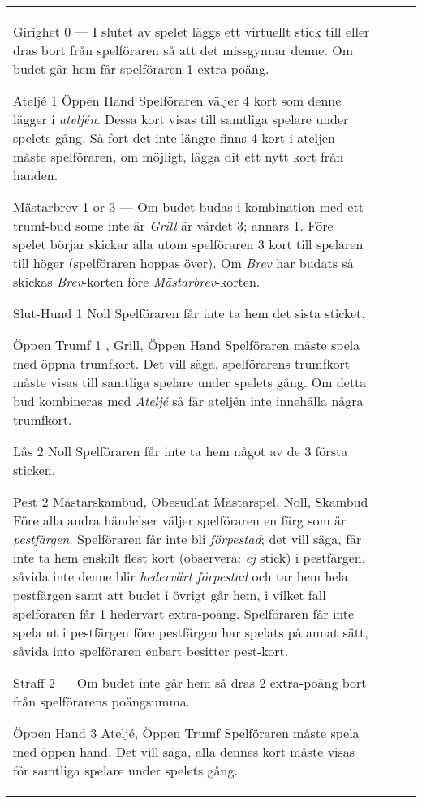 \begin{table}
\begin{center}
\begin{tabularx}{\textwidth}{
			l
			S[table-number-alignment=center, table-format=1.0]
			p{3cm}
			|X
		}
			\specialBidItem%
			{Girighet}
			{0}
			{---}
			{%
				I slutet av spelet läggs ett virtuellt stick till eller dras bort från spelföraren så att det missgynnar denne. Om budet går hem får spelföraren 1 extra-poäng.
			}

			\specialBidItem%
			{Ateljé}
			{1}
			{Öppen Hand}
			{%
				Spelföraren väljer 4 kort som denne lägger i \emph{ateljén}. Dessa kort visas till samtliga spelare under spelets gång. Så fort det inte längre finns 4 kort i ateljen måste spelföraren, om möjligt, lägga dit ett nytt kort från handen.
			}

			\specialBidItem%
			{Mästarbrev}
			{{1 or 3}}
			{---}
			{%
				Om budet budas i kombination med ett trumf-bud some inte är \emph{Grill} är värdet 3; annars 1. Före spelet börjar skickar alla utom spelföraren 3 kort till spelaren till höger (spelföraren hoppas över). Om \emph{Brev} har budats så skickas \emph{Brev}-korten före \emph{Mästarbrev}-korten.
			}

			\specialBidItem%
			{Slut-Hund}
			{1}
			{Noll}
			{%
				Spelföraren får inte ta hem det sista sticket.
			}

			\specialBidItem%
			{Öppen Trumf}
			{1}
			{\nonTrump, Grill, Öppen Hand}
			{%
				Spelföraren måste spela med öppna trumfkort. Det vill säga, spelförarens trumfkort måste visas till samtliga spelare under spelets gång. Om detta bud kombineras med \emph{Ateljé} så får ateljén inte innehålla några trumfkort.
			}

			\specialBidItem%
			{Lås}
			{2}
			{Noll}
			{%
				Spelföraren får inte ta hem något av de 3 första sticken.
			}

			\specialBidItem%
			{Pest}
			{2}
			{Mästarskambud, Obesudlat Mästarspel, Noll, Skambud}
			{%
				Före alla andra händelser väljer spelföraren en färg som är \emph{pestfärgen}. Spelföraren får inte bli \emph{förpestad}; det vill säga, får inte ta hem enskilt flest kort (observera: \emph{ej} stick) i pestfärgen, såvida inte denne blir \emph{hedervärt förpestad} och tar hem hela pestfärgen samt att budet i övrigt går hem, i vilket fall spelföraren får 1 hedervärt extra-poäng. Spelföraren får inte spela ut i pestfärgen före pestfärgen har spelats på annat sätt, såvida into spelföraren enbart besitter pest-kort.
			}

			\specialBidItem%
			{Straff}
			{2}
			{---}
			{%
				Om budet inte går hem så dras 2 extra-poäng bort från spelförarens poängsumma.
			}

			\specialBidItem%
			{Öppen Hand}
			{3}
			{Ateljé, Öppen Trumf}
			{%
				Spelföraren måste spela med öppen hand. Det vill säga, alla dennes kort måste visas för samtliga spelare under spelets gång.
			}
		\end{tabularx}
	\end{center}
\end{table}
